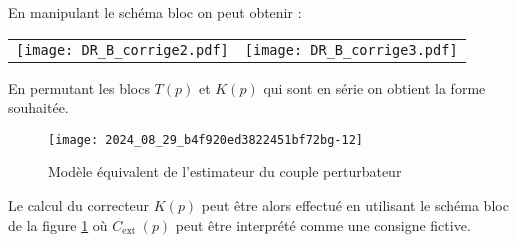 \ifprof
\begin{corrige}
En manipulant le schéma bloc on peut obtenir : 

\begin{center}
\begin{tabular}{cc}
\texttt{[image: DR\_B\_corrige2.pdf]}
&
\texttt{[image: DR\_B\_corrige3.pdf]}
\end{tabular}
\end{center}

En permutant les blocs $T(p)$ et $K(p)$ qui sont en série on obtient la forme souhaitée.

\end{corrige}
\else
\fi


\begin{figure}[!h]
\centering
\texttt{[image: 2024\_08\_29\_b4f920ed3822451bf72bg-12]}
\caption{\label{fig_13} Modèle équivalent de l'estimateur du couple perturbateur}
\end{figure}


Le calcul du correcteur $K(p)$ peut être alors effectué en utilisant le schéma bloc de la figure \ref{fig_13} où $C_{\text {ext }}(p)$ peut être interprété comme une consigne fictive.

